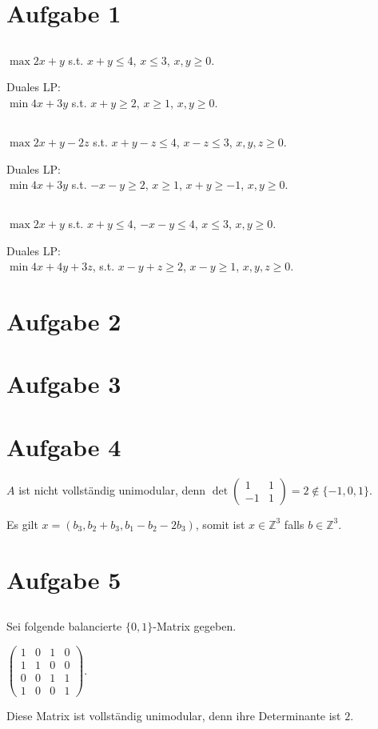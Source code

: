 \documentclass[a4paper]{article}
\begin{document}
\section{Aufgabe 1}
\subsection{}
$\max 2x+y$ s.t. $x+y \leq 4$, $x \leq 3$, $x,y \geq 0$.

Duales LP: \\
$\min 4x+3y$ s.t. $x+y \geq 2$, $x \geq 1$, $x,y \geq 0$.

\subsection{}
$\max 2x+y-2z$ s.t. $x+y-z \leq 4$, $x-z \leq 3$, $x,y,z \geq 0$.

Duales LP: \\
$\min 4x+3y$ s.t. $-x-y \geq 2$, $x \geq 1$, $x+y \geq -1$, $x,y \geq 0$.

\subsection{}
$\max 2x+y$ s.t. $x+y \leq 4$, $-x-y \leq 4$, $x \leq 3$, $x,y \geq 0$.

Duales LP: \\
$\min 4x+4y+3z$, s.t. $x-y+z \geq 2$, $x-y \geq 1$, $x,y,z \geq 0$.

\section{Aufgabe 2}

\section{Aufgabe 3}

\section{Aufgabe 4}
$A$ ist nicht vollständig unimodular, denn 
$\det \begin{pmatrix} 1&1\\-1&1 \end{pmatrix} = 2 \not\in \{ -1,0,1 \}$.

Es gilt $x = (b_3, b_2 + b_3, b_1 - b_2 - 2 b_3)$, somit ist $x \in
\mathbb{Z}^3$
falls $b \in \mathbb{Z}^3$.

\section{Aufgabe 5}
\subsection{}
\subsection{}
Sei folgende balancierte $\{0,1\}$-Matrix gegeben.

$\begin{pmatrix}
1 & 0 & 1 & 0 \\
1 & 1 & 0 & 0 \\
0 & 0 & 1 & 1 \\
1 & 0 & 0 & 1
\end{pmatrix}$.

Diese Matrix ist vollständig unimodular, denn ihre Determinante ist $2$.
\end{document}
